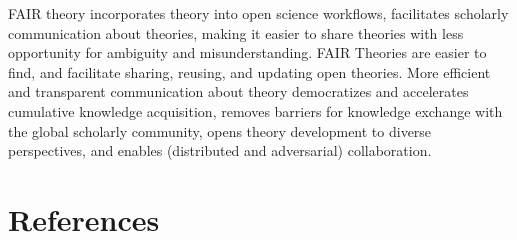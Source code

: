 \documentclass[
  man,floatsintext]{apa6}
\begin{document}
FAIR theory incorporates theory into open science workflows,
facilitates scholarly communication about theories,
making it easier to share theories with less opportunity for ambiguity and misunderstanding.
FAIR Theories are easier to find, and facilitate sharing, reusing, and updating open theories.
More efficient and transparent communication about theory democratizes and accelerates cumulative knowledge acquisition,
removes barriers for knowledge exchange with the global scholarly community,
opens theory development to diverse perspectives, and enables (distributed and adversarial) collaboration.

\newpage

\section{References}\label{references}
\end{document}
